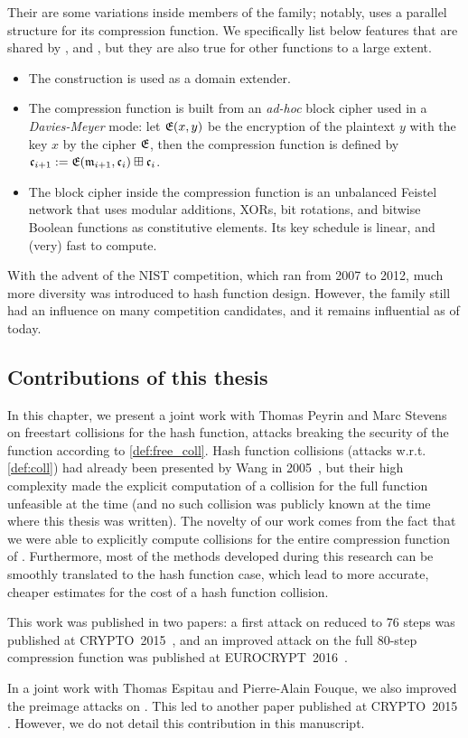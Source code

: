 Their are some variations inside members of the family; notably, \ripemd uses a parallel structure for its compression function. We specifically list below features that are shared by \mdfour, \mdfive and \sha, but they are also
true for other \mdsha functions to a large extent.
\begin{itemize}
\item The \merkdam construction is used as a domain extender.
\item The compression function is built from an \emph{ad-hoc} block cipher used in a \emph{Davies-Meyer} mode: let $\operatorname{\mathfrak{E}}(x,y)$ be the encryption of the plaintext $y$ with the key $x$ by the cipher $\operatorname{\mathfrak{E}}$, then
the compression function is defined by
$\mathfrak{c}_{i+1} := \operatorname{\mathfrak{E}}(\mathfrak{m}_{i+1},\mathfrak{c}_i) \boxplus \mathfrak{c}_i$.
\item The block cipher inside the compression function is an unbalanced Feistel network that uses modular additions, XORs, bit rotations, and bitwise Boolean functions as constitutive elements. Its key schedule is linear, and (very) fast to compute. 
\end{itemize}

With the advent of the NIST \shathree competition, which ran from 2007 to 2012, much more diversity was introduced to hash function design. However, the \mdsha family still had an influence on many competition candidates, and it remains
influential as of today.

\subsection{Contributions of this thesis}

In this chapter, we present a joint work with Thomas Peyrin and Marc Stevens on freestart collisions for the \shaone hash function, \ie attacks breaking the security of the function according to \autoref{def:free_coll}. Hash function
collisions (attacks w.r.t. \autoref{def:coll}) had already been presented by Wang \etal in 2005~\cite{DBLP:conf/crypto/WangYY05a}, but their high complexity made the explicit computation of a collision for the full function unfeasible
at the time (and no such collision was publicly known at the time where this thesis was written). The novelty of our work comes from the fact that we were able to explicitly compute collisions for the entire compression function
of \shaone. Furthermore, most of the methods developed during this research can be smoothly translated to the hash function case, which lead to more accurate, cheaper estimates for the cost of a hash function collision.

This work was published in two papers: a first attack on \shaone reduced to 76 steps was published at CRYPTO~2015~\cite{DBLP:conf/crypto/KarpmanPS15},
and an improved attack on the full 80-step compression function was published at EUROCRYPT~2016~\cite{DBLP:conf/eurocrypt/StevensKP16}. 

\medskip

In a joint work with Thomas Espitau and Pierre-Alain Fouque, we also improved the preimage attacks on \shaone. This led to another paper published at CRYPTO~2015 \cite{DBLP:conf/crypto/EspitauFK15}. However, we do not detail this contribution
in this manuscript.
